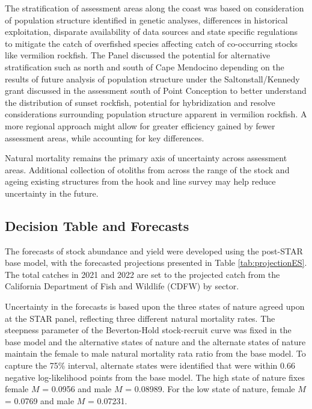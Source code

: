 \documentclass[11pt,
  english,
  a4paper,
]{article}
\begin{document}
\leavevmode\tagmcend\tagstructend

The stratification of assessment areas along the coast was based on consideration of population structure identified in genetic analyses, differences in historical exploitation, disparate availability of data sources and state specific regulations to mitigate the catch of overfished species affecting catch of co-occurring stocks like vermilion rockfish. The Panel discussed the potential for alternative stratification such as north and south of Cape Mendocino depending on the results of future analysis of population structure under the Saltonstall/Kennedy grant discussed in the assessment south of Point Conception to better understand the distribution of sunset rockfish, potential for hybridization and resolve considerations surrounding population structure apparent in vermilion rockfish. A more regional approach might allow for greater efficiency gained by fewer assessment areas, while accounting for key differences.

Natural mortality remains the primary axis of uncertainty across assessment areas. Additional collection of otoliths from across the range of the stock and ageing existing structures from the hook and line survey may help reduce uncertainty in the future.

\FloatBarrier


\hypertarget{decision-table-and-forecasts}{%
\subsection*{Decision Table and Forecasts}\label{decision-table-and-forecasts}}

\leavevmode\tagmcend\tagstructend

The forecasts of stock abundance and yield were developed using the post-STAR base model, with the forecasted projections presented in Table \ref{tab:projectionES}. The total catches in 2021 and 2022 are set to the projected catch from the California Department of Fish and Wildlife (CDFW) by sector.

Uncertainty in the forecasts is based upon the three states of nature agreed upon at the STAR panel, reflecting three different natural mortality rates. The steepness parameter of the Beverton-Hold stock-recruit curve was fixed in the base model and the alternative states of nature and the alternate states of nature maintain the female to male natural mortality rata ratio from the base model. To capture the 75\% interval, alternate states were identified that were within 0.66 negative log-likelihood points from the base model. The high state of nature fixes female {\(M\)\leavevmode\tagmcend\tagstructend} = 0.0956 and male {\(M\)\leavevmode\tagmcend\tagstructend} = 0.08989. For the low state of nature, female {\(M\)\leavevmode\tagmcend\tagstructend} = 0.0769 and male {\(M\)\leavevmode\tagmcend\tagstructend} = 0.07231.
\end{document}
